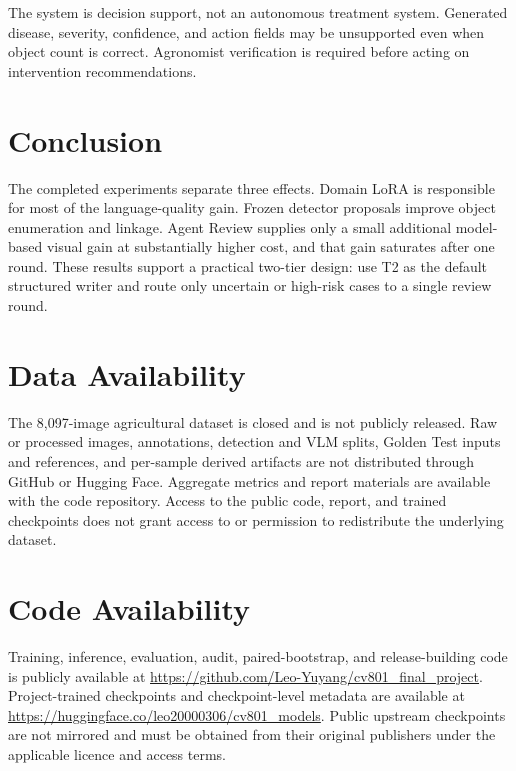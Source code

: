 \documentclass[11pt]{article}
\begin{document}
The system is decision support, not an autonomous treatment system. Generated
disease, severity, confidence, and action fields may be unsupported even when
object count is correct. Agronomist verification is required before acting on
intervention recommendations.

\section{Conclusion}

The completed experiments separate three effects. Domain LoRA is responsible
for most of the language-quality gain. Frozen detector proposals improve object
enumeration and linkage. Agent Review supplies only a small additional
model-based visual gain at substantially higher cost, and that gain saturates
after one round. These results support a practical two-tier design: use T2 as
the default structured writer and route only uncertain or high-risk cases to a
single review round.

\section*{Data Availability}

The 8,097-image agricultural dataset is closed and is not publicly released.
Raw or processed images, annotations, detection and VLM splits, Golden Test
inputs and references, and per-sample derived artifacts are not distributed
through GitHub or Hugging Face. Aggregate metrics and report materials are
available with the code repository. Access to the public code, report, and
trained checkpoints does not grant access to or permission to redistribute the
underlying dataset.

\section*{Code Availability}

Training, inference, evaluation, audit, paired-bootstrap, and release-building
code is publicly available at
\url{https://github.com/Leo-Yuyang/cv801_final_project}. Project-trained
checkpoints and checkpoint-level metadata are available at
\url{https://huggingface.co/leo20000306/cv801_models}. Public upstream
checkpoints are not mirrored and must be obtained from their original
publishers under the applicable licence and access terms.


\end{document}
